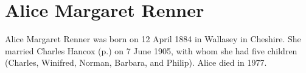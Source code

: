 \section{Alice Margaret Renner}\label{Alice_Margaret_Renner}

Alice Margaret Renner was born on 12 April 1884 in Wallasey in Cheshire.\cite{UKCensus1911_RG14_22074} She married Charles Hancox (p.\pageref{Charles_Edward_Hancox}) on 7 June 1905\cite{UKParishRegisters}, with whom she had five children (Charles, Winifred, Norman, Barbara, and Philip). Alice died in 1977.

